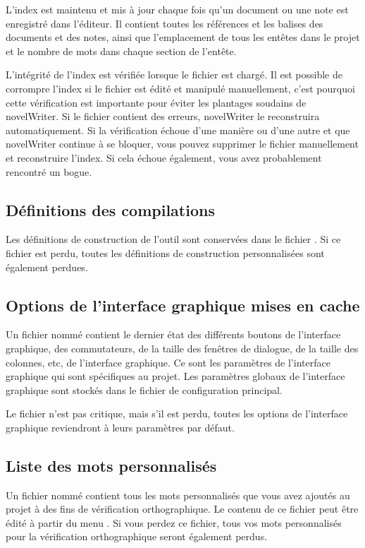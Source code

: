 \documentclass[a4paper,11pt,french]{sphinxmanual}
\begin{document}
\sphinxAtStartPar
L’index est maintenu et mis à jour chaque fois qu’un document ou une note est enregistré dans l’éditeur. Il contient toutes les références et les balises des documents et des notes, ainsi que l’emplacement de tous les en\sphinxhyphen{}têtes dans le projet et le nombre de mots dans chaque section de l’en\sphinxhyphen{}tête.

\sphinxAtStartPar
L’intégrité de l’index est vérifiée lorsque le fichier est chargé. Il est possible de corrompre l’index si le fichier est édité et manipulé manuellement, c’est pourquoi cette vérification est importante pour éviter les plantages soudains de novelWriter. Si le fichier contient des erreurs, novelWriter le reconstruira automatiquement. Si la vérification échoue d’une manière ou d’une autre et que novelWriter continue à se bloquer, vous pouvez supprimer le fichier manuellement et reconstruire l’index. Si cela échoue également, vous avez probablement rencontré un bogue.


\subsection{Définitions des compilations}
\label{\detokenize{tech_storage:build-definitions}}
\sphinxAtStartPar
Les définitions de construction de l’outil  sont conservées dans le fichier . Si ce fichier est perdu, toutes les définitions de construction personnalisées sont également perdues.


\subsection{Options de l’interface graphique mises en cache}
\label{\detokenize{tech_storage:cached-gui-options}}
\sphinxAtStartPar
Un fichier nommé  contient le dernier état des différents boutons de l’interface graphique, des commutateurs, de la taille des fenêtres de dialogue, de la taille des colonnes, etc, de l’interface graphique. Ce sont les paramètres de l’interface graphique qui sont spécifiques au projet. Les paramètres globaux de l’interface graphique sont stockés dans le fichier de configuration principal.

\sphinxAtStartPar
Le fichier n’est pas critique, mais s’il est perdu, toutes les options de l’interface graphique reviendront à leurs paramètres par défaut.


\subsection{Liste des mots personnalisés}
\label{\detokenize{tech_storage:custom-word-list}}
\sphinxAtStartPar
Un fichier nommé  contient tous les mots personnalisés que vous avez ajoutés au projet à des fins de vérification orthographique. Le contenu de ce fichier peut être édité à partir du menu . Si vous perdez ce fichier, tous vos mots personnalisés pour la vérification orthographique seront également perdus.
\end{document}

